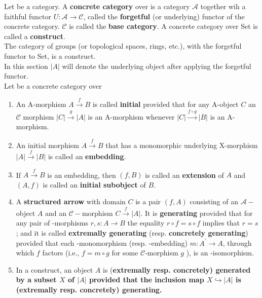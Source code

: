 Let \cc be a category. A \textbf{concrete category} over \cc is a category $\mathcal{A}$ together wih a faithful functor $U: \mathcal{A} \rightarrow \mathcal{C}$, called the \textbf{forgetful} (or underlying) functor of the concrete category. $\mathcal{C}$ is called the \textbf{base category}. A concrete category over Set is called a \textbf{construct}.\\
The category of groups (or topological spaces, rings, etc.), with the forgetful functor to Set, is a construct.\\
In this section $|A|$ will denote the underlying object after applying the forgetful functor.\\

Let \ca be a concrete category over \cc
\begin{enumerate}
    \item An A-morphism $A \xrightarrow{f} B$ is called \textbf{initial} provided that for any A-object $C$ an $\mathcal{C}$ morphism $|C| \xrightarrow{g}|A|$ is an A-morphism whenever $|C| \xrightarrow{f \circ g}|B|$ is an A-morphism.
    \item An initial morphism $A \xrightarrow{f} B$ that has a monomorphic underlying X-morphism $|A| \xrightarrow{f}|B|$ is called an \textbf{embedding}.
    \item If $A \xrightarrow{f} B$ is an embedding, then $(f, B)$ is called an \textbf{extension} of $A$ and $(A, f)$ is called an \textbf{initial subobject} of $B$.
    \item A \textbf{structured arrow} with domain $C$ is a pair $(f, A)$ consisting of an $\mathcal{A}-$object $A$ and an $\mathcal{C}-$morphism $C \xrightarrow{f}|A|$. It is \textbf{generating} provided that for any pair of \ca-morphisms $r, s: A \rightarrow B$ the equality $r \circ f=s \circ f$ implies that $r=s$; and it is called \textbf{extremally generating} (resp. \textbf{concretely generating}) provided that each \ca-monomorphism (resp. \ca-embedding) $m: A^{\prime} \rightarrow A$, through which $f$ factors (i.e., $f=m \circ g$ for some $\mathcal{C}$-morphism $g$ ), is an \ca-isomorphism.
    \item In a construct, an object $A$ is (\bf{extremally} resp. \bf{concretely}) generated by a subset $X$ of $|A|$ provided that the inclusion map $X \hookrightarrow|A|$ is (\bf{extremally} resp. \bf{concretely}) generating.
\end{enumerate}



